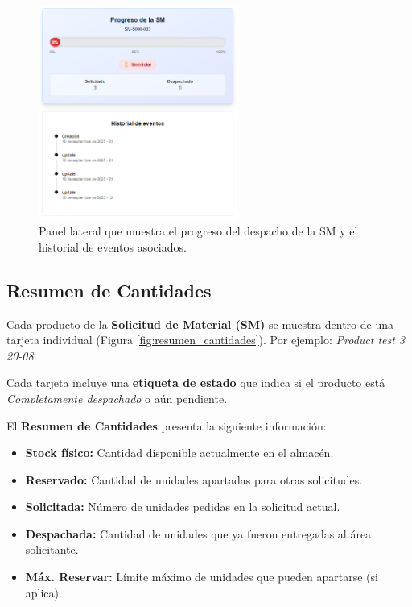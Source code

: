 \begin{figure}[H]
    \centering
    \includegraphics[height=7cm, keepaspectratio]{imgs/Almacen_General/Procesamiento_SM/procesamiento_sm_progeso_sm.png}
    \caption{Panel lateral que muestra el progreso del despacho de la SM y el historial de eventos asociados.}
    \label{fig:progreso_sm}
\end{figure}

\subsection{Resumen de Cantidades}

\vspace{-0.5em} %

Cada producto de la \textbf{Solicitud de Material (SM)} se muestra dentro de una tarjeta individual (Figura \ref{fig:resumen_cantidades}).  
Por ejemplo: \textit{Product test 3 20-08}.

Cada tarjeta incluye una \textbf{etiqueta de estado} que indica si el producto está \textit{Completamente despachado} o aún pendiente.

El \textbf{Resumen de Cantidades} presenta la siguiente información:

\begin{itemize}
    \item \textbf{Stock físico:} Cantidad disponible actualmente en el almacén.
    \item \textbf{Reservado:} Cantidad de unidades apartadas para otras solicitudes.
    \item \textbf{Solicitada:} Número de unidades pedidas en la solicitud actual.
    \item \textbf{Despachada:} Cantidad de unidades que ya fueron entregadas al área solicitante.
    \item \textbf{Máx. Reservar:} Límite máximo de unidades que pueden apartarse (si aplica).
\end{itemize}

